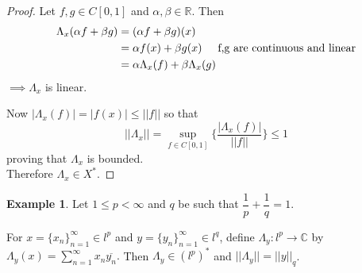 \documentclass[11pt,a4paper]{article}
\theoremstyle{definition}
\newtheorem{exa}[thm]{Example}
\begin{document}
\begin{proof}
Let $f,g\in C[0,1]$ and $\alpha, \beta \in \mathbb{R}$. Then
\begin{align*}
\Lambda_x(\alpha f+\beta g) &=(\alpha f+\beta g)(x)\\
                            &=\alpha f(x)+\beta g(x)\hspace{0.5cm} \text{f,g are continuous and linear}\\
                            &=\alpha \Lambda_x(f)+\beta \Lambda_x(g)
\end{align*}
$\implies \Lambda_x$ is linear.

Now $|\Lambda_x(f)|=|f(x)|\leq ||f||$\hspace{0.3cm} so that $$||\Lambda_x||=\sup_{f\in C[0,1]}\Bigg\{\frac{|\Lambda_x(f)|}{||f||}\Bigg\}\leq 1$$ proving that $\Lambda_x$ is bounded.\\ Therefore $\Lambda_x\in X^*$.
\end{proof}


\begin{exa}
Let $1\leq p<\infty$ and $q$ be such that $\dfrac{1}{p}+\dfrac{1}{q}=1$.

For $x=\{x_n\}^{\infty}_{n=1} \in l^p$ and $y=\{y_n\}^{\infty}_{n=1} \in l^q$, define $\Lambda_y :l^p\rightarrow \mathbb{C}$ by \hspace{0.3cm}$\Lambda_y(x)=\sum^{\infty}_{n=1}x_n \overline{y_n}.$ Then $\Lambda_y \in (l^p)^*$ and $||\Lambda_y||=||y||_q$.

\end{exa}
 
\end{document}
